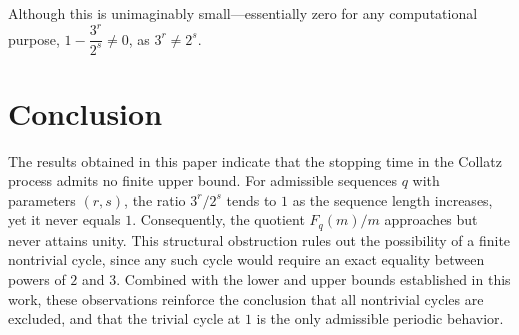\documentclass{amsart}
\theoremstyle{definition}
\theoremstyle{remark}
\numberwithin{equation}{section}
\begin{document}
Although this is unimaginably small—essentially zero for any computational purpose, $1-\dfrac{3^r}{2^s} \neq 0$, as $3^r \neq 2^s$.

\normalsize	

\section{Conclusion}

The results obtained in this paper indicate that the stopping time in the Collatz
process admits no finite upper bound. For admissible sequences $q$ with
parameters $(r,s)$, the ratio $3^{r}/2^{s}$ tends to $1$ as the sequence length
increases, yet it never equals $1$. Consequently, the quotient $F_{q}(m)/m$
approaches but never attains unity. This structural obstruction rules out the
possibility of a finite nontrivial cycle, since any such cycle would require an
exact equality between powers of $2$ and $3$. Combined with the lower and upper
bounds established in this work, these observations reinforce the conclusion that
all nontrivial cycles are excluded, and that the trivial cycle at $1$ is the only
admissible periodic behavior.

% 
\end{document}
